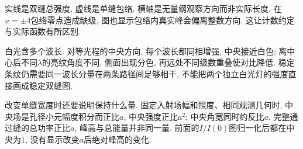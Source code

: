 \begin{center}
\end{center}
实线是双缝总强度, 虚线是单缝包络, 横轴是无量纲观察方向而非实际长度. 在$u=\pm4$包络零点造成缺级, 图也显示包络内真实峰会偏离整数方向. 这让计数约定与实际函数有所区别.

白光含多个波长. 对等光程的中央方向, 每个波长都同相增强, 中央接近白色; 离中心后不同$\lambda$的亮纹角度不同, 侧面出现分色, 再远处不同级数重叠使对比降低. 稳定条纹仍需要同一波长分量在两条路径间足够相干, 不能把两个独立白光灯的强度直接画成稳定双缝图.

改变单缝宽度时还要说明保持什么量. 固定入射场幅和照度、相同观测几何时, 中央场是孔径小元幅度积分而正比$a$, 中央强度正比$a^2$; 中央角宽同时约反比$a$. 完整通过缝的总功率正比$a$, 峰高与总能量并非同一量. 前面的$I/I(0)$图归一化后都在中央为1, 没有显示改变$a$后绝对峰高的变化.
